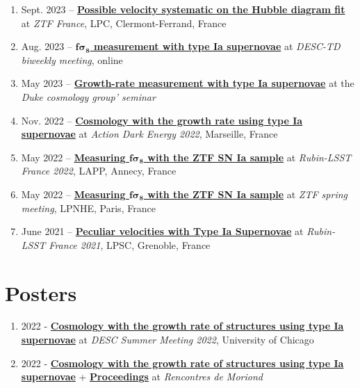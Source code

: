\documentclass[11pt,a4paper,sans]{article}
\begin{document}
\begin{enumerate}
  \item Sept. 2023 -- \href{https://indico.in2p3.fr/event/30615/contributions/128392/attachments/79574/116616/Possible%20impacts%20of%20velocities%20on%20the%20fit%20of%20the%20HD.pdf}{\textbf{Possible velocity systematic on the Hubble diagram fit}} at \textit{ZTF France}, LPC, Clermont-Ferrand, France 
  \item Aug. 2023 -- \href{https://bastiencarreres.github.io/talks/DESCTD-2023-03-28/index.html}{\textbf{$\boldsymbol{f\sigma_8}$ measurement with type Ia supernovae}} at \textit{DESC-TD biweekly meeting}, online 
  \item May 2023 --  \href{https://bastiencarreres.github.io/talks/duke-2023-04-20/index.html}{\textbf{Growth-rate measurement with type Ia supernovae}} at the \textit{Duke cosmology group’ seminar} 
  \item Nov. 2022 --  \href{https://indico.in2p3.fr/event/27399/contributions/116473/attachments/74014/106473/ADE_2022_bc.pdf}{\textbf{Cosmology with the growth rate using type Ia supernovae}} at \textit{Action Dark Energy 2022}, Marseille, France 
  \item May 2022 -- \href{https://indico.in2p3.fr/event/26455/contributions/109704/attachments/70514/100017/f%CF%838%20with%20SN%20Ia%20-%20LSST%20france.pdf}{\textbf{Measuring $\boldsymbol{f\sigma_8}$ with the ZTF SN Ia sample}} at \textit{Rubin-LSST France 2022}, LAPP, Annecy, France 
  \item May 2022 -- \href{https://indico.in2p3.fr/event/26793/contributions/109542/attachments/70416/99834/f%CF%838%20with%20SN%20Ia%20-%20ZTF%20Paris.pdf}{\textbf{Measuring $\boldsymbol{f\sigma_8}$ with the ZTF SN Ia sample}} at \textit{ZTF spring meeting}, LPNHE, Paris, France
  \item June 2021 -- \href{https://indico.in2p3.fr/event/23494/contributions/95032/attachments/64400/89320/Pre%CC%81sentation_lsst_france_final.pdf}{\textbf{Peculiar velocities with Type Ia Supernovae}} at \textit{Rubin-LSST France 2021}, LPSC, Grenoble, France
\end{enumerate}

\section{Posters}
\begin{enumerate}
  \item 2022 - \href{https://bastiencarreres.github.io/talks/Poster_Moriond_Chicago.pdf}{\textbf{Cosmology with the growth rate of structures using type Ia supernovae}} at \textit{DESC Summer Meeting 2022}, University of Chicago
  \item 2022 - \href{https://bastiencarreres.github.io/talks/Poster_Moriond_Chicago.pdf}{\textbf{Cosmology with the growth rate of structures using type Ia supernovae}} + \href{https://moriond.in2p3.fr/download/proceedings_cosmology_2022.pdf}{\textbf{Proceedings}} at \textit{Rencontres de Moriond}
\end{enumerate}
\end{document}
